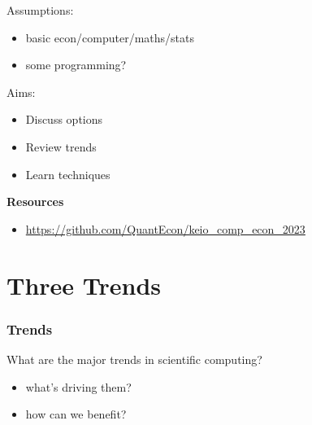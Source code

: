 \documentclass[
    xcolor={svgnames,dvipsnames},
    hyperref={colorlinks, citecolor=DeepPink4, linkcolor=DarkRed, urlcolor=DarkBlue}
    ]{beamer}  %
\newcommand{\1}{\mathbbm 1}
\begin{document}
\begin{frame}


    Assumptions:

    \begin{itemize}
        \item basic econ/computer/maths/stats 
        \vspace{0.3em}
        \item some programming?
    \end{itemize}

    \vspace{0.3em}
    \vspace{0.5em}
    Aims:

    \begin{itemize}
        \item Discuss options
        \vspace{0.5em}
        \item Review trends
        \vspace{0.5em}
        \item Learn techniques
    \end{itemize}

    \vspace{0.5em}
    \vspace{0.5em}
    \textbf{Resources}

    \begin{itemize}
        \item \url{https://github.com/QuantEcon/keio_comp_econ_2023}
    \end{itemize}


\end{frame}




\section{Three Trends}

\begin{frame}
    \frametitle{Trends}

    What are the major trends in scientific computing?

    \vspace{0.5em}
    \vspace{0.5em}

    \begin{itemize}
        \item what's driving them?
        \vspace{0.5em}
        \item how can we benefit?
    \end{itemize}
\end{frame}
\end{document}
